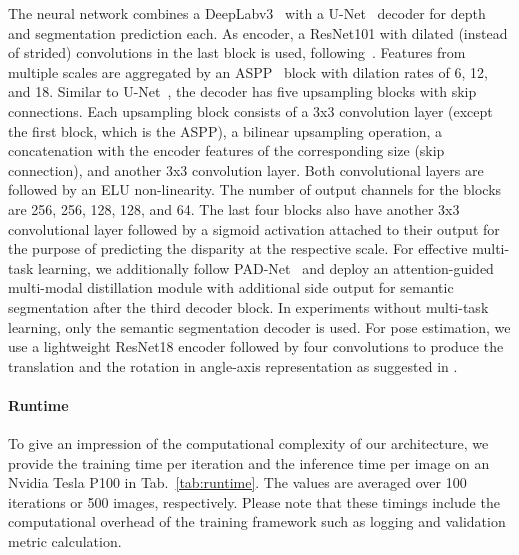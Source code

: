 \documentclass[final]{cvpr}
\begin{document}
The neural network combines a DeepLabv3~\cite{chen2017deeplab} with a U-Net~\cite{ronneberger2015u} decoder for depth and segmentation prediction each. As encoder, a ResNet101 with dilated (instead of strided) convolutions in the last block is used, following~\cite{chen2017deeplab}. Features from multiple scales are aggregated by an ASPP~\cite{chen2017deeplab} block with dilation rates of 6, 12, and 18.
Similar to U-Net~\cite{ronneberger2015u}, the decoder has five upsampling blocks with skip connections. Each upsampling block consists of a 3x3 convolution layer (except the first block, which is the ASPP), a bilinear upsampling operation, a concatenation with the encoder features of the corresponding size (skip connection), and another 3x3 convolution layer. Both convolutional layers are followed by an ELU non-linearity. The number of output channels for the blocks are 256, 256, 128, 128, and 64. The last four blocks also have another 3x3 convolutional layer followed by a sigmoid activation attached to their output for the purpose of predicting the disparity at the respective scale. For effective multi-task learning, we additionally follow PAD-Net~\cite{xu2018pad} and deploy an attention-guided multi-modal distillation module with additional side output for semantic segmentation after the third decoder block. In experiments without multi-task learning, only the semantic segmentation decoder is used.
For pose estimation, we use a lightweight ResNet18 encoder followed by four convolutions to produce the translation and the rotation in angle-axis representation as suggested in \cite{godard2019digging}.


\paragraph{Runtime}

To give an impression of the computational complexity of our architecture, we provide the training time per iteration and the inference time per image on an Nvidia Tesla P100 in Tab.~\ref{tab:runtime}. The values are averaged over 100 iterations or 500 images, respectively. Please note that these timings include the computational overhead of the training framework such as logging and validation metric calculation.
\end{document}
